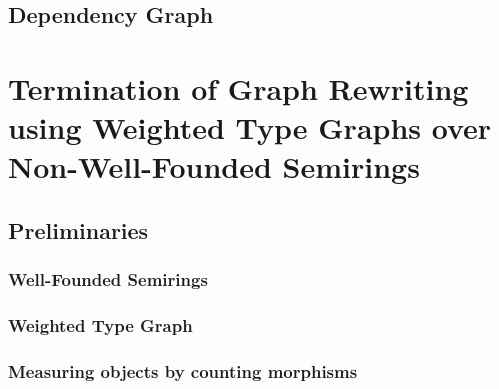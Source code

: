 \documentclass{report}
\begin{document}
\section{Dependency Graph}


\chapter{Termination of Graph Rewriting using Weighted Type Graphs over Non-Well-Founded Semirings} 
\label{chap:nwf}



\section{Preliminaries}

\subsection{Well-Founded Semirings} 
\label{sec:well_founded_semiring}

 
\subsection{Weighted Type Graph} 
\label{sec:weighted_type_graph}


\subsection{Measuring objects by counting morphisms}
\label{sec:type_graph:wf:measuring_graphs}

  
%    

%     
  
\end{document}
